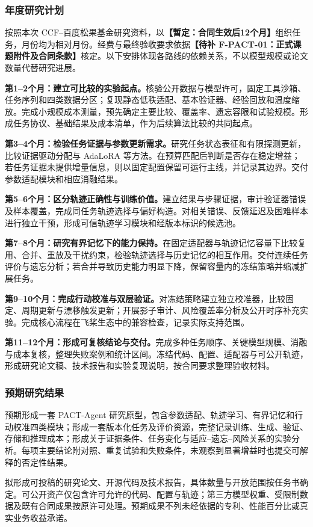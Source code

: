 \justifying
\NSFCBodyText

\subsubsection{年度研究计划}

按照本次 CCF--百度松果基金研究资料，以\textbf{【暂定：合同生效后12个月】}组织任务，月份均为相对月份。经费与最终验收要求依据\textbf{【待补 F-PACT-01：正式课题附件及合同条款】}核定。以下安排体现各路线的依赖关系，不以模型规模或论文数量代替研究进展。

\textbf{第1--2个月：建立可比较的实验起点。}核验公开数据与模型许可，固定工具沙箱、任务序列和四类数据分区；复现静态低秩适配、基本验证器、经验回放和温度缩放。完成小规模成本测量，预先确定主要比较、覆盖率、遗忘容限和试验规模。形成任务协议、基础结果及成本清单，作为后续算法比较的共同起点。

\textbf{第3--4个月：检验任务证据与参数更新需求。}研究任务状态表征和有限探测更新，比较证据驱动分配与 AdaLoRA 等方法。在预算匹配后判断是否存在稳定增益；若任务证据未提供增量信息，则以固定配置保留可运行主线，并记录其边界。交付参数适配模块和相应消融结果。

\textbf{第5--6个月：区分轨迹正确性与训练价值。}建立结果与步骤证据，审计验证器错误及样本覆盖，完成同任务轨迹选择与偏好构造。对相关错误、反馈延迟及困难样本进行独立干预，形成可信轨迹学习模块和经版本标识的候选池。

\textbf{第7--8个月：研究有界记忆下的能力保持。}在固定适配器与轨迹记忆容量下比较复用、合并、重放及干扰约束，检验轨迹选择与历史记忆的相互作用。交付连续任务评价与遗忘分析；若合并导致历史能力明显下降，保留容量内的冻结策略并缩减扩展任务。

\textbf{第9--10个月：完成行动校准与双层验证。}对冻结策略建立独立校准器，比较固定、周期更新与漂移触发更新；开展影子审计、风险覆盖率分析及公开时序补充实验。完成核心流程在飞桨生态中的兼容检查，记录实际支持范围。

\textbf{第11--12个月：形成可复核结论与交付。}完成多种任务顺序、关键模型规模、消融与成本复核，整理失败案例和统计区间。冻结代码、配置、适配器与可公开轨迹，形成研究论文稿、技术报告和实验复现说明，按合同要求整理验收材料。

\subsubsection{预期研究结果}

预期形成一套 PACT-Agent 研究原型，包含参数适配、轨迹学习、有界记忆和行动校准四类模块；形成一套版本化任务及评价资源，完整记录训练、生成、验证、存储和推理成本；形成关于证据条件、任务变化与适应--遗忘--风险关系的实验分析。每项主要结论附对照、重复试验和失败条件，未观察到显著增益时也提交可解释的否定性结果。

拟形成可投稿的研究论文、开源代码及技术报告，具体数量与开放范围按任务书确定。可公开资产仅包含许可允许的代码、配置与轨迹；第三方模型权重、受限制数据及既有合同成果按原许可处理。预期成果不列未经依据的专利、性能百分比或真实业务收益承诺。
